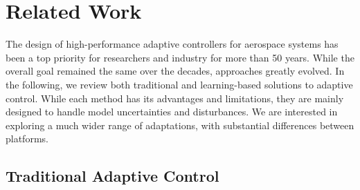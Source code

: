 \section{Related Work}
\label{sec:rel_work}






The design of high-performance adaptive controllers for aerospace systems has been a top priority for researchers and industry for more than 50 years.
%
While the overall goal remained the same over the decades, approaches greatly evolved.
%
In the following, we review both traditional and learning-based solutions to adaptive control.
%
While each method has its advantages and limitations, they are mainly designed to handle model uncertainties and disturbances.
%
We are interested in exploring a much wider range of adaptations, with substantial differences between platforms.


\subsection{Traditional Adaptive Control}

